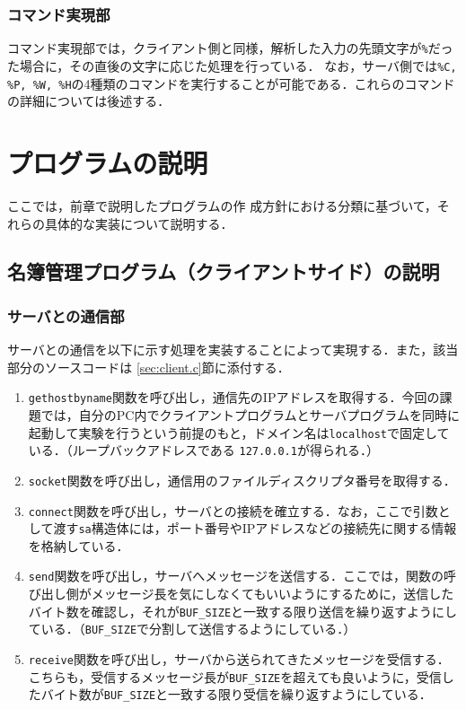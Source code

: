 \documentclass[11pt]{jsarticle}
\begin{document}
\subsubsection{コマンド実現部}
コマンド実現部では，クライアント側と同様，解析した入力の先頭文字が{\tt \%}だった場合に，その直後の文字に応じた処理を行っている．
なお，サーバ側では{\tt \%C, \%P, \%W, \%H}の4種類のコマンドを実行することが可能である．これらのコマンドの詳細については後述する．

\section{プログラムの説明}

ここでは，前章で説明したプログラムの作
成方針における分類に基づいて，それらの具体的な実装について説明する．

\subsection{名簿管理プログラム（クライアントサイド）の説明}

\subsubsection{サーバとの通信部}

サーバとの通信を以下に示す処理を実装することによって実現する．また，該当部分のソースコードは \ref{sec:client.c}節に添付する．

\begin{enumerate}
      \item {\tt gethostbyname}関数を呼び出し，通信先のIPアドレスを取得する．今回の課題では，自分のPC内でクライアントプログラムとサーバプログラムを同時に起動して実験を行うという前提のもと，ドメイン名は{\tt localhost}で固定している．（ループバックアドレスである {\tt 127.0.0.1}が得られる．）
      \item {\tt socket}関数を呼び出し，通信用のファイルディスクリプタ番号を取得する．
      \item {\tt connect}関数を呼び出し，サーバとの接続を確立する．なお，ここで引数として渡す{\tt sa}構造体には，ポート番号やIPアドレスなどの接続先に関する情報を格納している．
      \item {\tt send}関数を呼び出し，サーバへメッセージを送信する．ここでは，関数の呼び出し側がメッセージ長を気にしなくてもいいようにするために，送信したバイト数を確認し，それが{\tt BUF\_SIZE}と一致する限り送信を繰り返すようにしている．（{\tt BUF\_SIZE}で分割して送信するようにしている．）
      \item {\tt receive}関数を呼び出し，サーバから送られてきたメッセージを受信する．こちらも，受信するメッセージ長が{\tt BUF\_SIZE}を超えても良いように，受信したバイト数が{\tt BUF\_SIZE}と一致する限り受信を繰り返すようにしている．
\end{enumerate}
\end{document}
